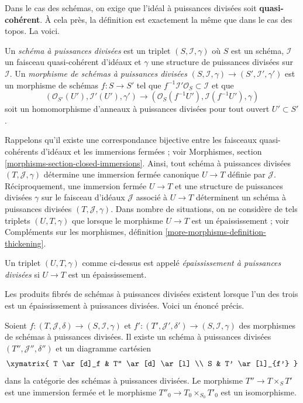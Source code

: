 \medskip\noindent
Dans le cas des schémas, on exige que l'idéal à puissances divisées soit
{\bf quasi-cohérent}. À cela près, la définition est exactement
la même que dans le cas des topos. La voici.

\begin{definition}
\label{definition-divided-power-scheme}
Un {\it schéma à puissances divisées} est un triplet $(S, \mathcal{I}, \gamma)$
où $S$ est un schéma, $\mathcal{I}$ un faisceau quasi-cohérent
d'idéaux et $\gamma$ une structure de puissances divisées sur $\mathcal{I}$.
Un {\it morphisme de schémas à puissances divisées}
$(S, \mathcal{I}, \gamma) \to (S', \mathcal{I}', \gamma')$ est
un morphisme de schémas $f : S \to S'$ tel que
$f^{-1}\mathcal{I}'\mathcal{O}_S \subset \mathcal{I}$ et que
$$
(\mathcal{O}_{S'}(U'), \mathcal{I}'(U'), \gamma')
\longrightarrow
(\mathcal{O}_S(f^{-1}U'), \mathcal{I}(f^{-1}U'), \gamma)
$$
soit un homomorphisme d'anneaux à puissances divisées pour tout ouvert $U' \subset S'$.
\end{definition}

\noindent
Rappelons qu'il existe une correspondance bijective entre les faisceaux
quasi-cohérents d'idéaux et les immersions fermées ; voir
Morphismes, section \ref{morphisms-section-closed-immersions}.
Ainsi, tout schéma à puissances divisées $(T, \mathcal{J}, \gamma)$
détermine une immersion fermée canonique $U \to T$ définie par $\mathcal{J}$.
Réciproquement, une immersion fermée $U \to T$ et une structure de puissances
divisées $\gamma$ sur le faisceau d'idéaux $\mathcal{J}$ associé
à $U \to T$ déterminent un schéma à puissances divisées $(T, \mathcal{J}, \gamma)$.
Dans nombre de situations, on ne considère de tels triplets
$(U, T, \gamma)$ que lorsque le morphisme $U \to T$ est un épaississement ; voir
Compléments sur les morphismes, définition \ref{more-morphisms-definition-thickening}.

\begin{definition}
\label{definition-divided-power-thickening}
Un triplet $(U, T, \gamma)$ comme ci-dessus est appelé {\it épaississement à puissances divisées}
si $U \to T$ est un épaississement.
\end{definition}

\noindent
Les produits fibrés de schémas à puissances divisées existent lorsque l'un des
trois est un épaississement à puissances divisées. Voici un énoncé précis.

\begin{lemma}
\label{lemma-fibre-product}
Soient $f : (T, \mathcal{J}, \delta) \to (S, \mathcal{I}, \gamma)$ et
$f' : (T', \mathcal{J}', \delta') \to (S, \mathcal{I}, \gamma)$
des morphismes de schémas à puissances divisées. Il existe un schéma à puissances divisées
$(T'', \mathcal{J}'', \delta'')$ et un diagramme cartésien
$$
\xymatrix{
T \ar[d]_f & T'' \ar[d] \ar[l] \\
S & T' \ar[l]_{f'}
}
$$
dans la catégorie des schémas à puissances divisées. Le morphisme
$T'' \to T \times_S T'$ est une immersion fermée et le morphisme
$T''_0 \to T_0 \times_{S_0} T'_0$ est un isomorphisme.
\end{lemma}


